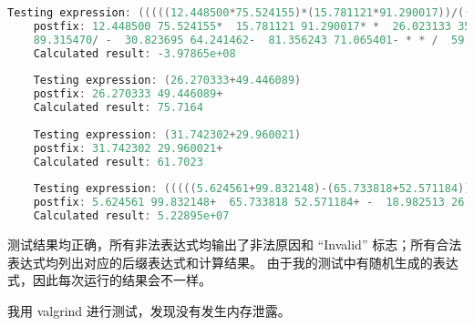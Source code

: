\documentclass[UTF8]{ctexart}
\begin{document}
\begin{lstlisting}[language=c++, breaklines=true, frame=shadowbox, rulesepcolor=\color{red!20!green!20!blue!20}]
    Testing expression: (((((12.448500*75.524155)*(15.781121*91.290017))/((26.023133+35.410627)/(22.269356-63.267922)))/(((38.062685+90.267647)-(13.455611/89.315470))*((30.823695-64.241462)*(81.356243-71.065401))))-((((59.089938+8.999908)+(29.358806+53.074740))*((68.523209*50.187689)+(21.863460+50.572222)))*(((76.528214*96.426283)/(96.374401-39.686270))/((15.607166-10.779138)/(38.102359-10.184027)))))     
    postfix: 12.448500 75.524155*  15.781121 91.290017* *  26.023133 35.410627+  22.269356 63.267922- / /  38.062685 90.267647+  13.455611 
    89.315470/ -  30.823695 64.241462-  81.356243 71.065401- * * /  59.089938 8.999908+  29.358806 53.074740+ +  68.523209 50.187689*  21.863460 50.572222+ + *  76.528214 96.426283*  96.374401 39.686270- /  15.607166 10.779138-  38.102359 10.184027- / / * -
    Calculated result: -3.97865e+08
    
    Testing expression: (26.270333+49.446089)
    postfix: 26.270333 49.446089+
    Calculated result: 75.7164
    
    Testing expression: (31.742302+29.960021)
    postfix: 31.742302 29.960021+
    Calculated result: 61.7023
    
    Testing expression: (((((5.624561+99.832148)-(65.733818+52.571184))+((18.982513-26.474807)*(90.142521/18.448439)))-(((62.163152/35.853145)+(35.654775-17.007965))*((78.389843+83.904538)-(11.697745*99.035615))))*((((30.689413/48.197882)/(5.105747-21.137120))+((57.731864-11.938841)*(67.220069-10.986663)))+(((92.193365*10.443434)+(63.512070+95.040742))*((41.605884/40.119633)/(85.680715+88.778344)))))      
    postfix: 5.624561 99.832148+  65.733818 52.571184+ -  18.982513 26.474807-  90.142521 18.448439/ * +  62.163152 35.853145/  35.654775 17.007965- +  78.389843 83.904538+  11.697745 99.035615* - * -  30.689413 48.197882/  5.105747 21.137120- /  57.731864 11.938841-  67.220069 10.986663- * +  92.193365 10.443434*  63.512070 95.040742+ +  41.605884 40.119633/  85.680715 88.778344+ / * + *
    Calculated result: 5.22895e+07
\end{lstlisting}

测试结果均正确，所有非法表达式均输出了非法原因和 “Invalid” 标志；所有合法表达式均列出对应的后缀表达式和计算结果。
由于我的测试中有随机生成的表达式，因此每次运行的结果会不一样。

我用 valgrind 进行测试，发现没有发生内存泄露。
\end{document}
